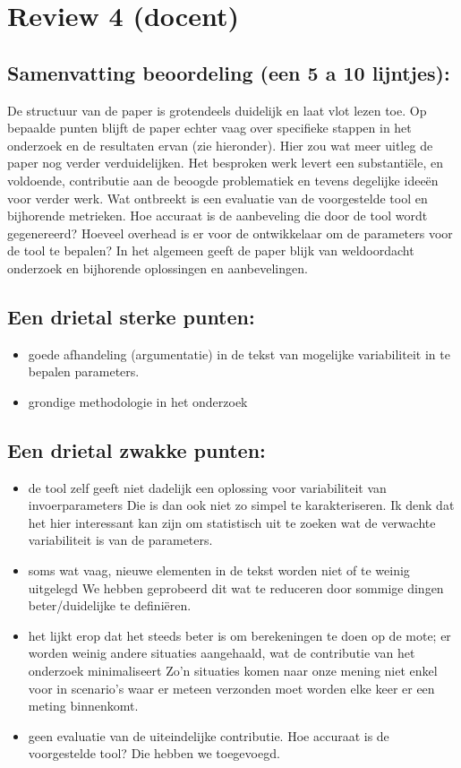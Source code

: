 \documentclass[11pt]{article}
\begin{document}
\section{Review 4 (docent)}

\subsection{Samenvatting beoordeling (een 5 a 10 lijntjes):}
De structuur van de paper is grotendeels duidelijk en laat vlot lezen toe. Op
bepaalde punten blijft de paper echter vaag over specifieke stappen in het
onderzoek en de resultaten ervan (zie hieronder). Hier zou wat meer uitleg de
paper nog verder verduidelijken. Het besproken werk levert een substantiële, en
voldoende, contributie aan de beoogde problematiek en tevens degelijke ideeën
voor verder werk. Wat ontbreekt is een evaluatie van de voorgestelde tool en
bijhorende metrieken. Hoe accuraat is de aanbeveling die door de tool wordt
gegenereerd? Hoeveel overhead is er voor de ontwikkelaar om de parameters voor
de tool te bepalen? In het algemeen geeft de paper blijk van weldoordacht
onderzoek en bijhorende oplossingen en aanbevelingen.



\subsection{Een drietal sterke punten:}
\begin{itemize}
\item goede afhandeling (argumentatie) in de tekst van mogelijke variabiliteit in te bepalen parameters.
\item grondige methodologie in het onderzoek
\end{itemize}

\subsection{Een drietal zwakke punten:}
\begin{itemize}
\item de tool zelf geeft niet dadelijk een oplossing voor variabiliteit van invoerparameters {\color{red} Die is dan ook niet zo simpel te karakteriseren. Ik denk dat het hier interessant kan zijn om statistisch uit te zoeken wat de verwachte variabiliteit is van de parameters.}
\item soms wat vaag, nieuwe elementen in de tekst worden niet of te weinig uitgelegd {\color{red} We hebben geprobeerd dit wat te reduceren door sommige dingen beter/duidelijke te definiëren.}
\item het lijkt erop dat het steeds beter is om berekeningen te doen op de mote;
er worden weinig andere situaties aangehaald, wat de contributie van het
onderzoek minimaliseert {\color{red} Zo'n situaties komen naar onze mening niet
enkel voor in scenario's waar er meteen verzonden moet worden elke keer er een
meting binnenkomt.}
\item geen evaluatie van de uiteindelijke contributie. Hoe accuraat is de voorgestelde tool? {\color{red} Die hebben we toegevoegd.}
\end{itemize}
\end{document}
